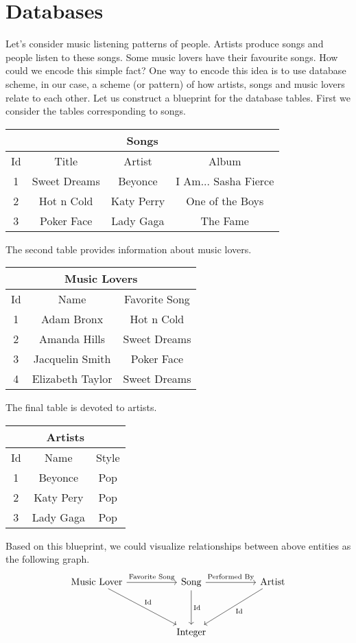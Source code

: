 \documentclass{report}
\theoremstyle{definition}
\begin{document}
\section*{Databases}
Let's consider music listening patterns of people. Artists produce songs and people listen to these songs. Some music lovers have their favourite songs. How could we encode this simple fact? One way to encode this idea is to use database scheme, in our case, a scheme (or pattern) of how artists, songs and music lovers relate to each other. Let us construct a blueprint for the database tables. First we consider the tables corresponding to songs. 
\begin{center}
\begin{tabular}{|c||c|c|c|}
\hline
\multicolumn{4}{|c|}{Songs}\\
\hline
Id & Title & Artist & Album\\
\hline
1 & Sweet Dreams & Beyonce & I Am... Sasha Fierce\\
2 & Hot n Cold & Katy Perry & One of the Boys\\
3 & Poker Face & Lady Gaga & The Fame\\
\hline
\end{tabular}
\end{center}
The second table provides information about music lovers.
\begin{center}
\begin{tabular}{|c||c|c|}
\hline
\multicolumn{3}{|c|}{Music Lovers}\\
\hline
Id & Name & Favorite Song\\
\hline
1 & Adam Bronx & Hot n Cold\\
2 & Amanda Hills & Sweet Dreams\\
3 & Jacquelin Smith & Poker Face\\
4 & Elizabeth Taylor & Sweet Dreams\\
\hline
\end{tabular}
\end{center}
The final table is devoted to artists.
\begin{center}
\begin{tabular}{|c||c|c|}
\hline
\multicolumn{3}{|c|}{Artists}\\
\hline
Id & Name & Style\\
\hline
1 & Beyonce & Pop\\
2 & Katy Pery & Pop\\
3 & Lady Gaga & Pop\\
\hline
\end{tabular}
\end{center}
Based on this blueprint, we could visualize relationships between above entities as the following graph.
\[
\begin{tikzcd}[column sep = huge, row sep = huge]
\text{Music Lover} \arrow[r, "\text{Favorite Song}"] \arrow[rd, "\text{Id}"] &
\text{Song} \arrow[r, "\text{Performed By}"] \arrow[d, "\text{Id}"] &
\text{Artist} \arrow[ld, "\text{Id}"] \\
& \text{Integer} &
\end{tikzcd}
\]
\end{document}
